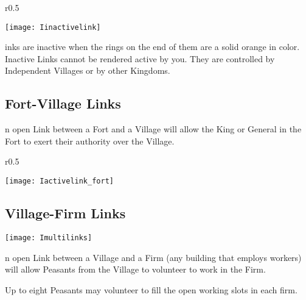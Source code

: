 
\begin{wrapfigure}{r}{0.5\textwidth}
    \vspace{-20pt}
    \begin{center}
        \texttt{[image: Iinactivelink]}
    \end{center}
    \vspace{-50pt}
\end{wrapfigure}

inks are inactive when the rings on the end of them are a solid orange in color. Inactive Links cannot be rendered active by you. They are controlled by Independent Villages or by other Kingdoms. 

\subsection{\textsf{Fort-Village Links}}


n open Link between a Fort and a Village will allow the King or General in the Fort to exert their authority over the Village.

\begin{wrapfigure}{r}{0.5\textwidth}
    \vspace{-20pt}
    \begin{center}
        \texttt{[image: Iactivelink\_fort]}
    \end{center}
    \vspace{-50pt}
\end{wrapfigure}

\subsection{\textsf{Village-Firm Links}}


\begin{center}
    \texttt{[image: Imultilinks]} %
\end{center}

n open Link between a Village and a Firm (any building that employs workers) will allow Peasants from the Village to volunteer to work in the Firm.

Up to eight Peasants may volunteer to fill the open working slots in each firm.

